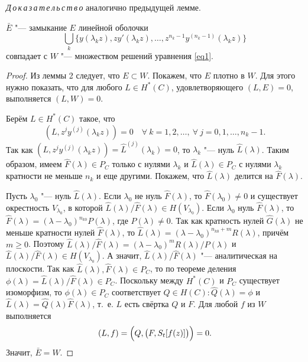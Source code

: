 \smallskip

\textit{Д\,о\,к\,а\,з\,а\,т\,е\,л\,ь\,с\,т\,в\,о}\/ аналогично предыдущей лемме.

\smallskip


\begin{theorem}[1]$\bar E$ "--- замыкание $E$ линейной оболочки $$\bigcup\limits_k \{y(\lambda_kz),zy'(\lambda_kz),\dots, z^{n_k-1}y^{(n_k-1)}(\lambda_kz)\}$$ совпадает с $W$ "--- множеством решений уравнения \eqref{eq1}{\rm .}
\end{theorem}

\smallskip


\begin{proof} Из леммы 2 следует, что $E\subset W$. 
Покажем, что $E$ плотно в $W$. 
Для этого нужно показать, что для любого $L\in H^*(C)$, удовлетворяющего $(L,E)=0$, выполняется $(L,W)=0$. 

Берём $L\in H^*(C)$ такое, что 
$$(L,z^jy^{(j)}(\lambda_kz))=0 \quad  \forall ~ k=1, 2, \dots, ~ \forall ~ j={0, 1, \dots, n_k-1}.$$ Так как $(L,z^jy^{(j)}(\lambda_kz))=\hat L^{(j)}(\lambda_k)=0$, то $\lambda_k$ "--- нуль $\hat L(\lambda)$. Таким образом, имеем $\hat F(\lambda)\in P_C$ только с нулями $\lambda_k$ и $\hat L(\lambda)\in P_C$ с нулями $\lambda_k$ кратности не меньше $n_k$ и еще другими. Покажем, что $\hat L(\lambda)$ делится на $\hat F(\lambda)$. 

Пусть $\lambda_0$ "--- нуль $\hat L(\lambda)$. Если $\lambda_0$ не нуль $\hat F(\lambda)$, то $\hat F(\lambda_0)\neq 0$ и существует окрестность $V_{\lambda_0}$, в которой 
${\hat L(\lambda)}/{\hat F(\lambda)}\in H(V_{\lambda_0})$. 
Если $\lambda_0$ нуль $\hat F(\lambda)$, то $\hat F(\lambda)=(\lambda-\lambda_0)^{n_{k0}}P(\lambda)$, где $P(\lambda)\neq 0$. Так как кратность нулей $\hat G(\lambda)$ не меньше кратности нулей $\hat F(\lambda)$, то $\hat L(\lambda)=(\lambda-\lambda_0)^{n_{k0}+m}R(\lambda)$, причём $m\geq 0$. 
Поэтому ${\hat L(\lambda)}/{\hat F(\lambda)}=(\lambda-\lambda_0)^m {R(\lambda)}/{P(\lambda)}$ и 
$ {\hat L(\lambda)}/{\hat F(\lambda)}\in H(V_{\lambda_0})$. А значит, ${\hat L(\lambda)}/{\hat F(\lambda)}$ "--- аналитическая на плоскости. 
Так как $\hat L(\lambda),\hat F(\lambda)\in P_C$, то по теореме деления \cite{zabirova2} $\phi(\lambda)={\hat L(\lambda)}/{\hat F(\lambda)}\in P_C$. Поскольку между $H^*(C)$ и $P_C$ существует изоморфизм, то $\phi(\lambda)\in P_C$ соответствует $Q\in H(C):\hat Q(\lambda)=\phi$ и $\hat L(\lambda)=\hat Q(\lambda)\hat F(\lambda)$, т.~е. $L$ есть свёртка $Q$ и $F$. Для любой $f$ из $W$ выполняется $$(L,f)=\Bigl(Q,\bigl(F,S_t[f(z)]\bigr)\Bigr)=0.$$ 
Значит, $\bar E=W$. \end{proof}

